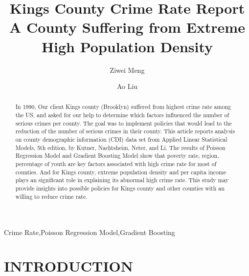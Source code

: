 \documentclass[preprint,12pt,3p]{elsarticle}
\begin{document}
\begin{frontmatter}

\title{\textbf{Kings County Crime Rate Report}\\
A County Suffering from Extreme High Population Density
}

\author{Ziwei Meng}
\author{Ao Liu}



\begin{abstract}
  In 1990, Our client Kings county (Brooklyn) suffered from highest crime rate among the US, and asked for our help to determine which factors influenced the number of serious crimes per county. The goal was to implement policies that would lead to the reduction of the number of serious crimes in their county.
  \bigbreak
  This article reports analysis on county demographic information (CDI) data set from Applied Linear Statistical Models, 5th edition, by Kutner, Nachtsheim, Neter, and Li. The results of Poisson Regression Model and Gradient Boosting Model show that poverty rate, region, percentage of youth are key factors associated with high crime rate for most of counties. And for Kings county, extreme population density and per capita income plays an significant role in explaining its abnormal high crime rate.
  \bigbreak
  This study may provide insights into possible policies for Kings county and other counties with an willing to reduce crime rate.
\end{abstract}

\begin{keyword}
Crime Rate\sep Poisson Regression Model\sep Gradient Boosting
\end{keyword}

\end{frontmatter}


\section{INTRODUCTION}
\label{sec1}
\end{document}
